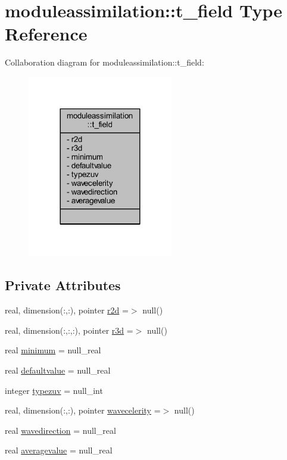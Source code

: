 \hypertarget{structmoduleassimilation_1_1t__field}{}\section{moduleassimilation\+:\+:t\+\_\+field Type Reference}
\label{structmoduleassimilation_1_1t__field}


Collaboration diagram for moduleassimilation\+:\+:t\+\_\+field\+:\nopagebreak
\begin{figure}[H]
\begin{center}
\leavevmode
\includegraphics[width=180pt]{structmoduleassimilation_1_1t__field__coll__graph}
\end{center}
\end{figure}
\subsection*{Private Attributes}
\begin{DoxyCompactItemize}
\item 
real, dimension(\+:,\+:), pointer \mbox{\hyperlink{structmoduleassimilation_1_1t__field_aab5ad2134df9d0d71254dc13e15ffed9}{r2d}} =$>$ null()
\item 
real, dimension(\+:,\+:,\+:), pointer \mbox{\hyperlink{structmoduleassimilation_1_1t__field_a32da59fc90328bbeb9124a2292723aa7}{r3d}} =$>$ null()
\item 
real \mbox{\hyperlink{structmoduleassimilation_1_1t__field_a9d8e45cc4f6192ba6b6992e7ac16ea99}{minimum}} = null\+\_\+real
\item 
real \mbox{\hyperlink{structmoduleassimilation_1_1t__field_a961b0be8a900f05e5267a4c4f6c5ee26}{defaultvalue}} = null\+\_\+real
\item 
integer \mbox{\hyperlink{structmoduleassimilation_1_1t__field_a25ddb82a9cbc88f523c00034ccdb95ff}{typezuv}} = null\+\_\+int
\item 
real, dimension(\+:,\+:), pointer \mbox{\hyperlink{structmoduleassimilation_1_1t__field_a09db5e0733da5b3009df66ffcce09104}{wavecelerity}} =$>$ null()
\item 
real \mbox{\hyperlink{structmoduleassimilation_1_1t__field_a56dcb0783c6171a42563233c21949890}{wavedirection}} = null\+\_\+real
\item 
real \mbox{\hyperlink{structmoduleassimilation_1_1t__field_adc4e87aa12545f13324add757ff73ce8}{averagevalue}} = null\+\_\+real
\end{DoxyCompactItemize}


